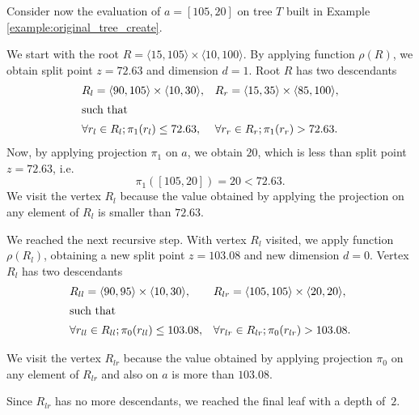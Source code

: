 \begin{example}
\label{ex:regular_point_evaluation_original}
    Consider now the evaluation of $a = [105,20]$ on tree $T$ built in Example \ref{example:original_tree_create}.

    We start with the root $R = \langle 15,105\rangle \times \langle 10, 100 \rangle$.
    By applying function $\rho(R)$, we obtain split point $z = 72.63$ and dimension $d = 1$.
    Root $R$ has two descendants 
\begin{align*}
    &R_l = \langle 90,105\rangle \times \langle 10, 30 \rangle,&
    &R_r = \langle 15,35\rangle \times \langle 85, 100 \rangle,\\
    \intertext{such that}
    &\forall r_l\in R_l; \pi_1(r_l) \le 72.63,&
    &\forall r_r\in R_r; \pi_1(r_r) > 72.63.
\end{align*}
Now, by applying projection $\pi_1$ on $a$, we obtain $20$, which is less than split point $z = 72.63$, i.e.
$$\pi_1([105,20]) = 20 < 72.63.$$
We visit the vertex $R_l$ because the value obtained by applying the projection on any element of $R_l$ is smaller than $72.63$.

We reached the next recursive step. With vertex $R_l$ visited, we apply function $\rho(R_l)$, obtaining a new split point $z = 103.08$ and new dimension $d = 0$.
Vertex $R_l$ has two descendants 
\begin{align*}
    &R_{ll} = \langle 90,95\rangle \times \langle 10, 30 \rangle,&
    &R_{lr} = \langle 105,105\rangle \times \langle 20,20 \rangle,\\
    \intertext{such that}
    &\forall r_{ll}\in R_{ll}; \pi_0(r_{ll}) \le 103.08,&
    &\forall r_{lr}\in R_{lr}; \pi_0(r_{lr}) > 103.08.
\end{align*}

We visit the vertex $R_{lr}$ because the value obtained by applying projection $\pi_0$ on any element of $R_{lr}$ and also on $a$ is more than $103.08$.

Since $R_{lr}$ has no more descendants, we reached the final leaf with a depth of~$2$.
\end{example}


